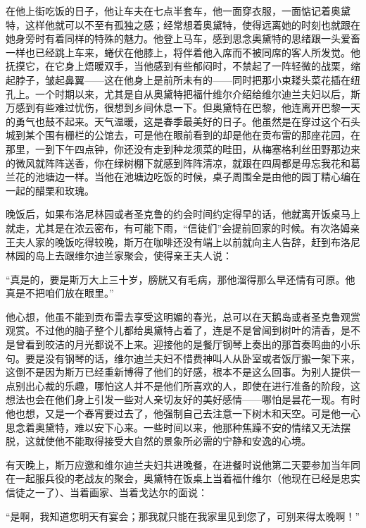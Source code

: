 \par 在他上街吃饭的日子，他让车夫在七点半套车，他一面穿衣服，一面惦记着奥黛特，这样他就可以不至有孤独之感；经常想着奥黛特，使得远离她的时刻也就跟在她身旁时有着同样的特殊的魅力。他登上马车，感到思念奥黛特的思绪跟一头爱畜一样也已经跳上车来，蜷伏在他膝上，将伴着他入席而不被同席的客人所发觉。他抚摸它，在它身上焐暖双手，当他感到有些郁闷时，不禁起了一阵轻微的战栗，缩起脖子，皱起鼻翼——这在他身上是前所未有的——同时把那小束耧头菜花插在纽孔上。一个时期以来，尤其是自从奥黛特把福什维尔介绍给维尔迪兰夫妇以后，斯万感到有些难过忧伤，很想到乡间休息一下。但奥黛特在巴黎，他连离开巴黎一天的勇气也鼓不起来。天气温暖，这是春季最美好的日子。他虽然是在穿过这个石头城到某个围有栅栏的公馆去，可是他在眼前看到的却是他在贡布雷的那座花园，在那里，一到下午四点钟，你还没有走到种龙须菜的畦田，从梅塞格利丝田野那边来的微风就阵阵送香，你在绿树棚下就感到阵阵清凉，就跟在四周都是毋忘我花和葛兰花的池塘边一样。当他在池塘边吃饭的时候，桌子周围全是由他的园丁精心编在一起的醋栗和玫瑰。
\par 晚饭后，如果布洛尼林园或者圣克鲁的约会时间约定得早的话，他就离开饭桌马上就走，尤其是在浓云密布，有可能下雨，“信徒们”会提前回家的时候。有次洛姆亲王夫人家的晚饭吃得较晚，斯万在咖啡还没有端上以前就向主人告辞，赶到布洛尼林园的岛上去跟维尔迪兰家聚会，使得亲王夫人说：
\par “真是的，要是斯万大上三十岁，膀胱又有毛病，那他溜得那么早还情有可原。他真是不把咱们放在眼里。”
\par 他心想，他虽不能到贡布雷去享受这明媚的春光，总可以在天鹅岛或者圣克鲁观赏观赏。不过他的脑子整个儿都给奥黛特占着了，连是不是曾闻到树叶的清香，是不是曾看到皎洁的月光都说不上来。迎接他的是餐厅钢琴上奏出的那首奏鸣曲的小乐句。要是没有钢琴的话，维尔迪兰夫妇不惜费神叫人从卧室或者饭厅搬一架下来，这倒不是因为斯万已经重新博得了他们的好感，根本不是这么回事。为别人提供一点别出心裁的乐趣，哪怕这人并不是他们所喜欢的人，即使在进行准备的阶段，这想法也会在他们身上引发一些对人亲切友好的美好感情——哪怕是昙花一现。有时他也想，又是一个春宵要过去了，他强制自己去注意一下树木和天空。可是他一心思念着奥黛特，难以安下心来。一些时间以来，他那种焦躁不安的情绪又无法摆脱，这就使他不能取得接受大自然的景象所必需的宁静和安逸的心境。
\par 有天晚上，斯万应邀和维尔迪兰夫妇共进晚餐，在进餐时说他第二天要参加当年同在一起服兵役的老战友的聚会，奥黛特在饭桌上当着福什维尔（他现在已经是忠实信徒之一了）、当着画家、当着戈达尔的面说：
\par “是啊，我知道您明天有宴会；那我就只能在我家里见到您了，可别来得太晚啊！”
